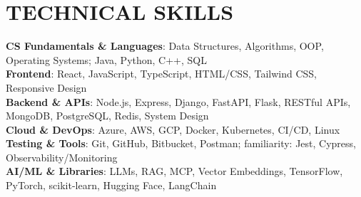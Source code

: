 \vspace{-7pt}

\section{\textbf{TECHNICAL SKILLS}}
\begin{itemize}[leftmargin=0.15in, label={}]
  \small{\item{
    \textbf{CS Fundamentals \& Languages}: Data Structures, Algorithms, OOP, Operating Systems; Java, Python, C++, SQL \\[1pt]
    \textbf{Frontend}: React, JavaScript, TypeScript, HTML/CSS, Tailwind CSS, Responsive Design \\[1pt]
    \textbf{Backend \& APIs}: Node.js, Express, Django, FastAPI, Flask, RESTful APIs, MongoDB, PostgreSQL, Redis, System Design \\[1pt]
    \textbf{Cloud \& DevOps}: Azure, AWS, GCP, Docker, Kubernetes, CI/CD, Linux \\[1pt]
    \textbf{Testing \& Tools}: Git, GitHub, Bitbucket, Postman; familiarity: Jest, Cypress, Observability/Monitoring \\[1pt]
    \textbf{AI/ML \& Libraries}: LLMs, RAG, MCP, Vector Embeddings, TensorFlow, PyTorch, scikit-learn, Hugging Face, LangChain
  }}
\end{itemize}

